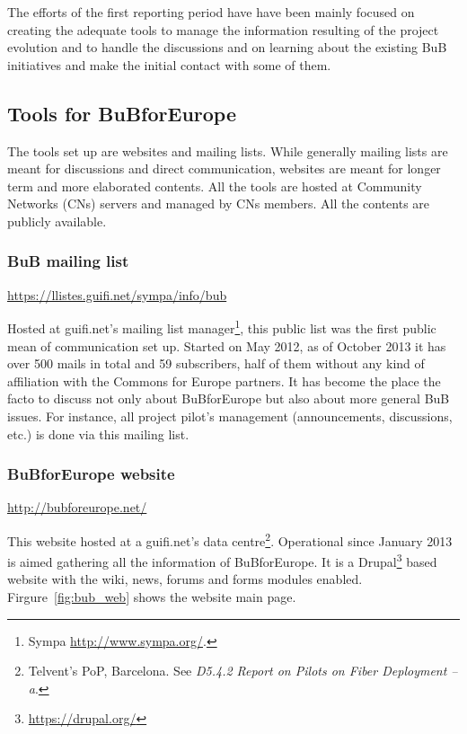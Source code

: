 The efforts of the first reporting period have have been mainly focused on creating the adequate tools to manage the information resulting of the project evolution and to handle the discussions and on learning about the existing BuB initiatives and make the initial contact with some of them.

\subsection{Tools for BuBforEurope}
\label{tools}

The tools set up are websites and mailing lists. While generally mailing lists are meant for discussions and direct communication, websites are meant for longer term and more elaborated contents. All the tools are hosted at Community Networks (CNs) servers and managed by CNs members. All the contents are publicly available.

\subsubsection{BuB mailing list}

\url{https://llistes.guifi.net/sympa/info/bub}

Hosted at guifi.net's mailing list manager\footnote{Sympa \url{http://www.sympa.org/}.}, this public list was the first public mean of communication set up. Started on May 2012, as of October 2013 it has over 500 mails in total and 59 subscribers, half of them without any kind of affiliation with the Commons for Europe partners. It has become the place the facto to discuss not only about BuBforEurope but also about more general BuB issues. For instance, all project pilot's management (announcements, discussions, etc.) is done via this mailing list.


\subsubsection{BuBforEurope website}

\url{http://bubforeurope.net/}

This website hosted at a guifi.net's data centre\footnote{Telvent's PoP, Barcelona. See \emph{D5.4.2 Report on Pilots on Fiber Deployment -- a}.}. Operational since January 2013 is aimed gathering all the information of BuBforEurope. It is a Drupal\footnote{\url{https://drupal.org/}} based website with the wiki, news, forums and forms modules enabled. Firgure~\ref{fig:bub_web} shows the website main page.

